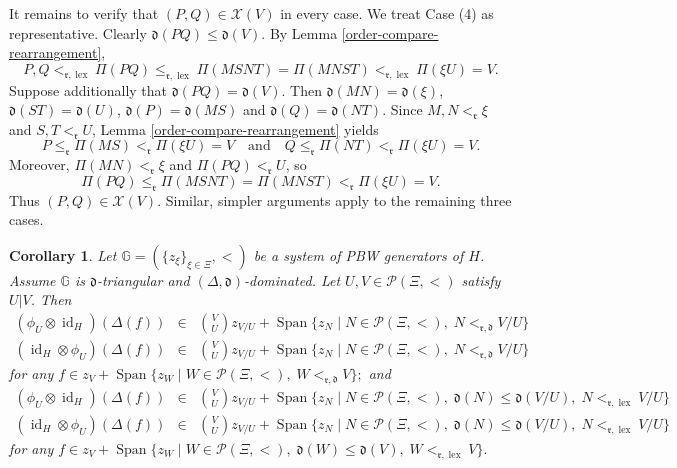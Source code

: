 \documentclass{article}
\makeatletter
\renewenvironment{proof}[1][\proofname]{\par
	\pushQED{\qed}%
	\normalfont \topsep6\p@\@plus6\p@\relax
	\trivlist
	\item[\hskip\labelsep
	\bfseries
	#1\@addpunct{.}]\ignorespaces
}{%
	\popQED\endtrivlist\@endpefalse
}
\theoremstyle{plain}
\newtheorem{corollary}[thm]{Corollary}
\theoremstyle{definition}
\numberwithin{equation}{section}
\DeclareMathOperator{\id}{id}
\DeclareMathOperator{\Span}{Span}
\DeclareMathOperator{\lex}{lex}
\newcommand{\PP}{\mathcal{P}}
\newcommand{\GG}{\mathbb{G}}
\newcommand{\dd}{\mathfrak{d}}
\newcommand{\rr}{\mathfrak{r}}
\makeatother
\begin{document}
\begin{proof}
		It remains to verify that $(P,Q) \in \mathcal{X}(V)$ in every case. We treat Case (4) as representative. Clearly $\dd(PQ) \leq \dd (V)$. By Lemma \ref{order-compare-rearrangement},
		\[
		P ,Q <_{\rr,\lex} \Pi(PQ) \leq _{\rr,\lex}   \Pi(MSNT) = \Pi(MNST)  <_{\rr,\lex} \Pi(\xi U) =V.
		\]
		Suppose additionally that $\dd(PQ) =\dd(V)$. Then $\dd(MN) =\dd(\xi)$, $\dd(ST)=\dd(U)$, $\dd(P)=\dd(MS)$ and $\dd(Q)=\dd(NT)$. Since $M,N<_{\rr} \xi$ and  $S,T <_{\rr} U$, Lemma \ref{order-compare-rearrangement} yields
		\[
		P \leq _{\rr} \Pi(MS) <_{\rr} \Pi(\xi U) =V  \quad \text{and} \quad Q \leq _{\rr} \Pi(NT) <_{\rr} \Pi(\xi U) =V.
		\]
		Moreover, $\Pi(MN) <_{\rr} \xi$ and $\Pi(PQ) <_{\rr} U$, so
		\[
		\Pi(PQ) \leq _{\rr} \Pi(MSNT) = \Pi(MNST) <_{\rr} \Pi(\xi U) =V.
		\]
		Thus $(P,Q) \in \mathcal{X}(V)$. Similar, simpler arguments apply to the remaining three cases.
	\end{proof}
	
	\begin{corollary}\label{core facts}
		Let $\GG=(\{z_\xi\}_{\xi \in\Xi},<)$ be a system of PBW generators of $H$. Assume $\GG$ is $\dd$-triangular and $(\Delta,\dd)$-dominated. Let $U, V\in \PP(\Xi,<)$ satisfy $U|V$. Then
		\begin{eqnarray*}
			(\phi_{U}\otimes \id_{H})(\Delta(f))   &\in &  \binom{V}{U} z_{V/U} + \Span\{z_{N}\mid N\in \PP(\Xi,<),\; N<_{\rr,\dd} V/U \}\\
			(\id_{H}\otimes \phi_{U}) (\Delta(f))  &\in &  \binom{V}{U} z_{V/U} + \Span\{z_{N}\mid N\in \PP(\Xi,<),\; N<_{\rr,\dd} V/U \}
		\end{eqnarray*}
		for any $f\in  z_{V} +\Span\{z_{W} \mid W\in \PP(\Xi, <),\; W <_{\rr,\dd} V\};$ and
		\begin{eqnarray*}
			(\phi_{U}\otimes \id_{H})(\Delta(f))  &\in& \binom{V}{U} z_{V/U} + \Span\{z_{N}\mid N\in \PP(\Xi,<),\; \dd(N) \leq \dd(V/U),\; N <_{\rr,\lex} V/U  \}\\
			(\id_{H}\otimes \phi_{U}) (\Delta(f)) &\in&  \binom{V}{U} z_{V/U} + \Span\{z_{N}\mid N\in \PP(\Xi,<),\; \dd(N) \leq \dd(V/U),\; N <_{\rr,\lex} V/U  \}
		\end{eqnarray*}
		for any $f\in  z_{V} +\Span\{z_{W} \mid W\in \PP(\Xi, <),\; \dd(W) \leq \dd(V),\; W <_{\rr,\lex} V\}.$
	\end{corollary}
	
\end{document}
